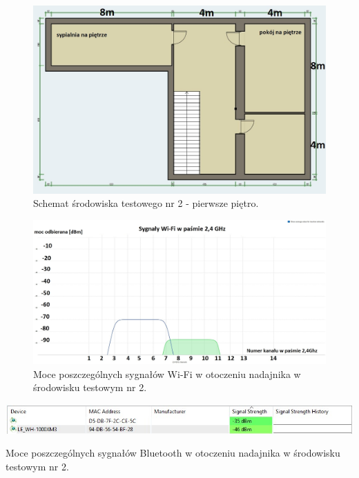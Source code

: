 \documentclass[12pt, twoside, openany]{mwrep}
\begin{document}
\begin{figure}[H]
\centering
\includegraphics[scale=0.4]{dom2pietro}
\caption{Schemat środowiska testowego nr 2 - pierwsze piętro.}
\end{figure}
\begin{figure}[H]
\centering
\includegraphics[scale=0.35]{2,4Ghz_Dom}
\caption{Moce poszczególnych sygnałów Wi-Fi w otoczeniu nadajnika w środowisku testowym nr 2.}
\end{figure}
\begin{table}[H]
\centering
\includegraphics[scale=0.8]{bt_dom}
\caption{Moce poszczególnych sygnałów Bluetooth w otoczeniu nadajnika w środowisku testowym nr 2.}
\end{table}

\end{document}
